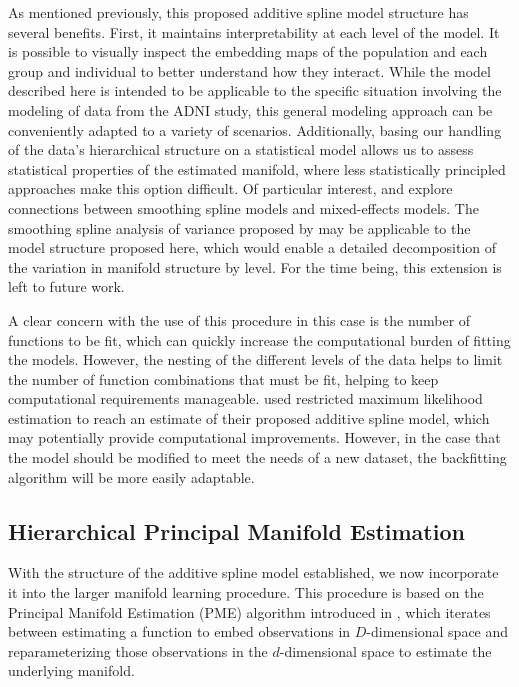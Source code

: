 \documentclass[11pt,reqno]{article}
\theoremstyle{definition}
\begin{document}
As mentioned previously, this proposed additive spline model structure has several benefits. First, it maintains interpretability at each level of the model. It is possible to visually inspect the embedding maps of the population and each group and individual to better understand how they interact. While the model described here is intended to be applicable to the specific situation involving the modeling of data from the ADNI study, this general modeling approach can be conveniently adapted to a variety of scenarios. Additionally, basing our handling of the data's hierarchical structure on a statistical model allows us to assess statistical properties of the estimated manifold, where less statistically principled approaches make this option difficult. Of particular interest, \cite{wangMixedEffectsSmoothing1998} and \cite{brumbackSmoothingSplineModels1998} explore connections between smoothing spline models and mixed-effects models. The smoothing spline analysis of variance proposed by \cite{wangMixedEffectsSmoothing1998} may be applicable to the model structure proposed here, which would enable a detailed decomposition of the variation in manifold structure by level. For the time being, this extension is left to future work.

A clear concern with the use of this procedure in this case is the number of functions to be fit, which can quickly increase the computational burden of fitting the models. However, the nesting of the different levels of the data helps to limit the number of function combinations that must be fit, helping to keep computational requirements manageable. \cite{brumbackSmoothingSplineModels1998} used restricted maximum likelihood estimation to reach an estimate of their proposed additive spline model, which may potentially provide computational improvements. However, in the case that the model should be modified to meet the needs of a new dataset, the backfitting algorithm will be more easily adaptable. 

\subsection{Hierarchical Principal Manifold Estimation}

With the structure of the additive spline model established, we now incorporate it into the larger manifold learning procedure. This procedure is based on the Principal Manifold Estimation (PME) algorithm introduced in \cite{mengPrincipalManifoldEstimation2021}, which iterates between estimating a function to embed observations in $D$-dimensional space and reparameterizing those observations in the $d$-dimensional space to estimate the underlying manifold.
\end{document}
